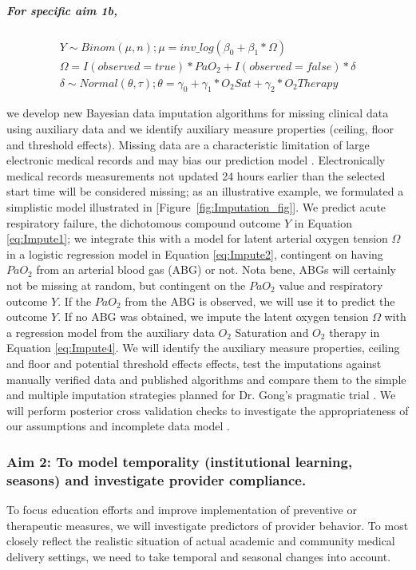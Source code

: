 \documentclass[11pt,notitlepage]{article}
\begin{document}
\subparagraph*{For specific aim 1b,} \begin{figure}
\vspace{-25pt}
\begin{align} \label{eq:Impute1}
Y \sim Binom(\mu, n); \mu = inv\_log(\beta_{0} + \beta_{1} * \Omega) \\ \label{eq:Impute2}
\Omega =  I(observed = true) * PaO_{2}   +   I(observed = false) * \delta  \\ 
\delta \sim Normal(\theta, \tau); \theta = \gamma_{0} + \gamma_{1}* O_{2} Sat + \gamma_{2} * O_{2} Therapy \label{eq:Impute4}
\end{align}
\vspace{-35pt}
\end{figure}we develop new Bayesian data imputation algorithms for missing clinical data using auxiliary data and we identify auxiliary measure properties (ceiling, floor and threshold effects). Missing data are a characteristic limitation of large electronic medical records and may bias our prediction model \cite{Dean_19279318}. Electronically medical records measurements not updated 24 hours earlier than the selected start time will be considered missing;  as an illustrative example, we formulated a simplistic model illustrated in [Figure~\ref{fig:Imputation_fig}]. We predict acute respiratory failure, the dichotomous compound outcome $Y$ in Equation \ref{eq:Impute1}; we integrate this with a model for latent arterial oxygen tension $\Omega$ in a logistic regression model in Equation \ref{eq:Impute2}, contingent on having $PaO_{2}$ from an arterial blood gas (ABG) or not. Nota bene, ABGs will certainly not be missing at random, but contingent on the $PaO_2$ value and respiratory outcome $Y$. If the $PaO_{2}$ from the ABG is observed, we will use it to predict the outcome $Y$. If no ABG was obtained, we impute the latent oxygen tension $\Omega$ with a regression model from the auxiliary data  $O_{2}$ Saturation and $O_{2}$ therapy in Equation \ref{eq:Impute4}. We will identify the auxiliary measure properties, ceiling and floor and potential threshold effects effects, test the imputations against manually verified data and published algorithms and compare them to the simple and multiple imputation strategies planned for Dr. Gong's pragmatic trial \cite{Huntington_16311133,Sloan_15027501}.  We will perform posterior cross validation checks to investigate the appropriateness of our assumptions and incomplete data model \cite{Gelman1998notasked}.

\subsubsection*{Aim 2: To model temporality (institutional learning, seasons) and investigate provider compliance.}
To focus education efforts and improve implementation of preventive or therapeutic measures, we will investigate predictors of provider behavior. To most closely reflect the realistic situation of actual academic and community medical delivery settings, we need to take temporal and seasonal changes into account. 
  
\end{document}
